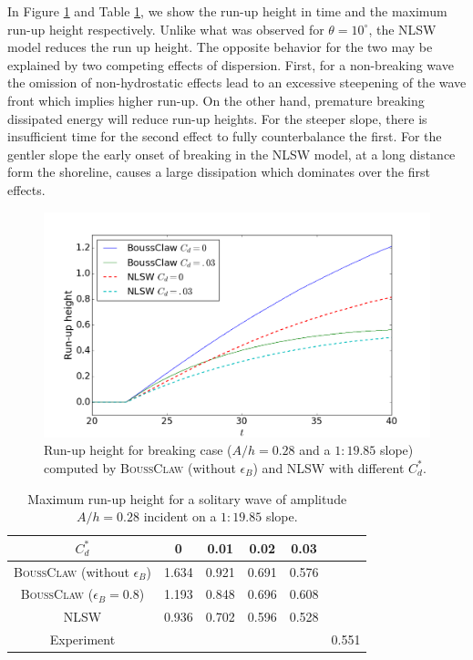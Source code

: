 \documentclass[review]{elsarticle}
\newcommand{\BoussClaw}{\textsc{BoussClaw} }
\begin{document}
In Figure \ref{fig:runup_slope_1_20} and Table \ref{tab:max_runup_1_20},
we show the run-up height in time and the maximum run-up height respectively.
Unlike what was observed for $\theta=10^\circ$, the NLSW model
reduces the run up height. 
The opposite behavior for the two may be 
explained by two competing effects of dispersion. 
First, for a non-breaking wave the omission of non-hydrostatic effects 
lead to an excessive 
steepening of the wave front which implies higher run-up. 
On the other hand, 
premature breaking dissipated energy will reduce run-up heights. 
For the steeper slope, 
there is insufficient time for the second effect to fully 
counterbalance the first. 
For the gentler slope the early onset of breaking
in the NLSW model, at a long distance form the shoreline, causes a large 
dissipation which dominates over the first effects.

\begin{figure}[!htb]
	\centering
			\includegraphics[width=.8\textwidth]{_fig/runup_slope_1_20}
		\caption{Run-up height for breaking case ($A/h=0.28$ and a $1:19.85$ slope) computed by \BoussClaw 
			(without $\epsilon_B$) and NLSW with different $C_d^*$.}
		\label{fig:runup_slope_1_20}
\end{figure}

\begin{table}
		\begin{tabular}{cccccc} \hline
			           $C_d^*$ & 0 & 0.01 & 0.02 & 0.03 &  \\ \hline
			\BoussClaw (without $\epsilon_B$)& 1.634 & 0.921 & 0.691 & 0.576  &  \\ 
			\BoussClaw ($\epsilon_B=0.8$)& 1.193 & 0.848 & 0.696 & 0.608 &  \\
			NLSW & 0.936 & 0.702 & 0.596 & 0.528 &  \\
			\hline
			Experiment  & & & & & 0.551 \\
			\hline
		\end{tabular}
	\caption{Maximum run-up height for a solitary wave of amplitude $A/h=0.28$ incident on  a $1:19.85$ slope.}%
	\label{tab:max_runup_1_20}
\end{table}
\end{document}
